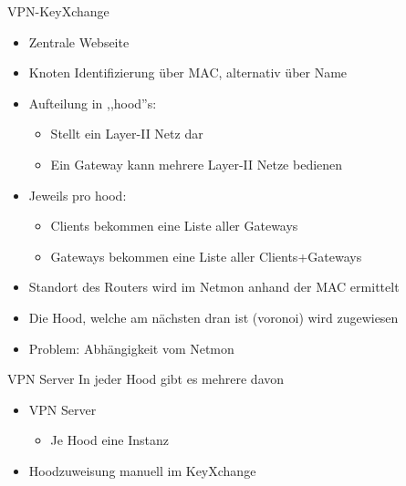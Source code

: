 \begin{frame}{VPN-KeyXchange}
    \begin{itemize}
        \item Zentrale Webseite
        \item Knoten Identifizierung über MAC, alternativ über Name
        \item Aufteilung in ,,hood''s:
        \begin{itemize}
            \item Stellt ein Layer-II Netz dar
            \item Ein Gateway kann mehrere Layer-II Netze bedienen
        \end{itemize}
        \item Jeweils pro hood:
        \begin{itemize}
            \item Clients bekommen eine Liste aller Gateways
            \item Gateways bekommen eine Liste aller Clients+Gateways
        \end{itemize}
        \item Standort des Routers wird im Netmon anhand der MAC ermittelt
        \item Die Hood, welche am nächsten dran ist (voronoi) wird zugewiesen
        \item Problem: Abhängigkeit vom Netmon
    \end{itemize}
\end{frame}

\begin{frame}{VPN Server}
    In jeder Hood gibt es mehrere davon
    \begin{itemize}
        \item VPN Server
        \begin{itemize}
            \item Je Hood eine Instanz
        \end{itemize}
        \item Hoodzuweisung manuell im KeyXchange
    \end{itemize}
\end{frame}

